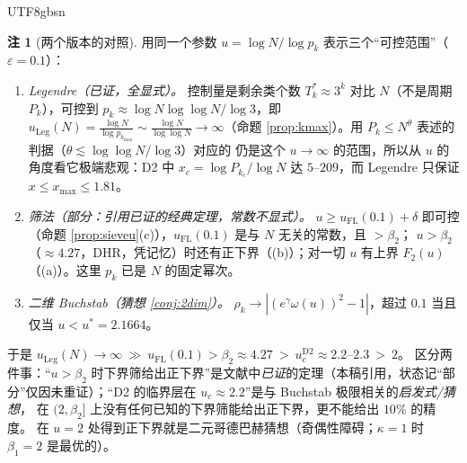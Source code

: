 \documentclass[11pt,a4paper]{article}
\newcommand{\Tmix}{T^{*}}               %
\newcommand{\kmax}{k_{\max}}
\theoremstyle{plain}
\theoremstyle{definition}
\newtheorem{rem}[prop]{注}
\begin{document}
\begin{CJK}{UTF8}{gbsn}
\begin{rem}[两个版本的对照]\label{rem:twoversions}
用同一个参数 $u=\log N/\log p_k$ 表示三个“可控范围”（$\varepsilon=0.1$）：
\begin{enumerate}[leftmargin=*,label=(\arabic*)]
\item \emph{Legendre（已证，全显式）。} 控制量是剩余类个数 $\Tmix_k\approx3^k$ 对比 $N$（不是周期 $P_k$），可控到 $p_k\approx\log N\log\log N/\log3$，即
$u_{\mathrm{Leg}}(N)=\frac{\log N}{\log p_{\kmax}}\sim\frac{\log N}{\log\log N}\to\infty$（命题 \ref{prop:kmax}）。用 $P_k\le N^\theta$ 表述的判据（$\theta\lesssim\log\log N/\log3$）对应的
仍是这个 $u\to\infty$ 的范围，所以从 $u$ 的角度看它极端悲观：D2 中 $x_c=\log P_{k_c}/\log N$ 达 $5$--$209$，而 Legendre 只保证 $x\le x_{\max}\le1.81$。
\item \emph{筛法（部分：引用已证的经典定理，常数不显式）。} $u\ge u_{\mathrm{FL}}(0.1)+\delta$ 即可控（命题 \ref{prop:sieveu}(c)），$u_{\mathrm{FL}}(0.1)$ 是与 $N$ 无关的常数，且 $>\beta_2$；
$u>\beta_2$（$\approx4.27$，DHR，凭记忆）时还有正下界（(b)）；对一切 $u$ 有上界 $F_2(u)$（(a)）。这里 $p_k$ 已是 $N$ 的固定幂次。
\item \emph{二维 Buchstab（猜想 \ref{conj:2dim}）。} $\rho_k\to|(e^\gamma\omega(u))^2-1|$，超过 $0.1$ 当且仅当 $u<u^*=2.1664$。
\end{enumerate}
于是 $u_{\mathrm{Leg}}(N)\to\infty\ \gg\ u_{\mathrm{FL}}(0.1)>\beta_2\approx4.27\ >\ u_c^{\mathrm{D2}}\approx2.2\text{--}2.3\ >\ 2$。
区分两件事：“$u>\beta_2$ 时下界筛给出正下界”是文献中\emph{已证}的定理（本稿引用，状态记“部分”仅因未重证）；“D2 的临界层在 $u_c\approx2.2$”是与 Buchstab 极限相关的\emph{启发式/猜想}，
在 $(2,\beta_2]$ 上没有任何已知的下界筛能给出正下界，更不能给出 $10\%$ 的精度。
在 $u=2$ 处得到正下界就是二元哥德巴赫猜想（奇偶性障碍；$\kappa=1$ 时 $\beta_1=2$ 是最优的）。
\end{rem}


\end{CJK}
\end{document}

